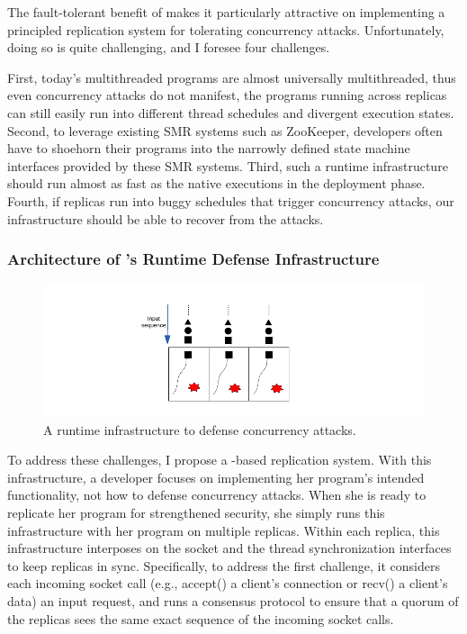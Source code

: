 The fault-tolerant benefit of \smr makes it particularly attractive
on implementing a principled replication system for tolerating concurrency 
attacks. Unfortunately, doing so is quite challenging, and I foresee four 
challenges.

First, today's multithreaded programs are almost universally
multithreaded, thus even concurrency attacks do not manifest, the programs 
running across replicas can still easily run into different thread schedules 
and divergent execution states. Second, to leverage existing SMR systems such 
as ZooKeeper, developers often have to shoehorn their programs into the 
narrowly defined state machine interfaces provided by these SMR systems. Third, 
such a runtime infrastructure should run almost as fast as the native executions 
in the deployment phase. Fourth, if replicas run into buggy schedules that 
trigger concurrency attacks, our infrastructure should be able to recover from 
the attacks.

\vspace{-.15in}\subsubsection{Architecture of \xxx's Runtime Defense Infrastructure} 
\label{sec:defense-arch}\vspace{-.075in}

\begin{figure}[ht]
\centering
\includegraphics[width=0.3\columnwidth]{figures/defense}
\vspace{-.05in}
\caption{{A runtime infrastructure to defense concurrency attacks.}} 
\label{fig:defense}
\vspace{-.05in}
\end{figure}

To address these challenges, I propose a \smr-based replication 
system. With this infrastructure, a developer focuses on implementing her 
program's intended functionality, not how to defense concurrency attacks. When 
she is ready to replicate her program for strengthened security, she simply
runs this infrastructure with her program on multiple replicas. Within
each replica, this infrastructure interposes on the socket and the thread
synchronization interfaces to keep replicas in sync. Specifically, to address 
the first challenge, it considers each incoming socket call (e.g., accept() a 
client's connection or recv() a client's data) an input request, and runs a 
\paxos consensus protocol to ensure that a quorum of the replicas sees the same 
exact sequence of the incoming socket calls.

